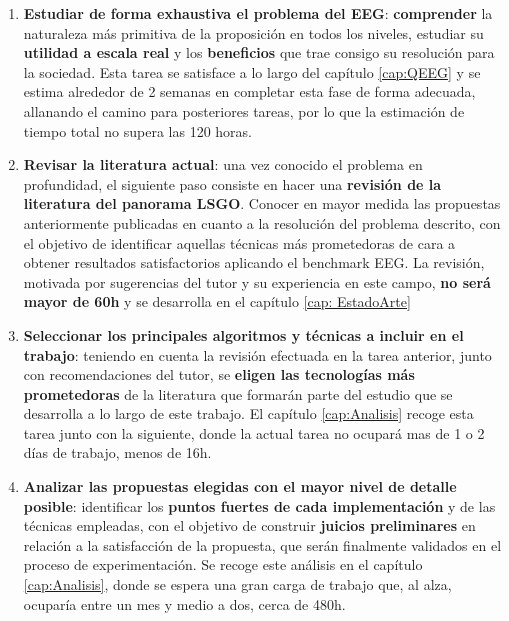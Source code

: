 \begin{enumerate}
	\item \label{tarea1} \textbf{Estudiar de forma exhaustiva el problema del EEG}: \textbf{comprender} la naturaleza más primitiva de la proposición en todos los niveles, estudiar su \textbf{utilidad a escala real} y los \textbf{beneficios} que trae consigo su resolución para la sociedad. Esta tarea se satisface a lo largo del capítulo \ref{cap:QEEG} y se estima alrededor de 2 semanas en completar esta fase de forma adecuada, allanando el camino para posteriores tareas, por lo que la estimación de tiempo total no supera las 120 horas. 
	
	\item \label{tarea2} \textbf{Revisar la literatura actual}: una vez conocido el problema en profundidad, el siguiente paso consiste en hacer una \textbf{revisión de la literatura del panorama LSGO}. Conocer en mayor medida las propuestas anteriormente publicadas en cuanto a la resolución del problema descrito, con el objetivo de identificar aquellas técnicas más prometedoras de cara a obtener resultados satisfactorios aplicando el benchmark EEG. La revisión, motivada por sugerencias del tutor y su experiencia en este campo, \textbf{no será mayor de 60h} y se desarrolla en el capítulo \ref{cap: EstadoArte}
	
	\item \label{tarea3} \textbf{Seleccionar los principales algoritmos y técnicas a incluir en el trabajo}: teniendo en cuenta la revisión efectuada en la tarea anterior, junto con recomendaciones del tutor, se \textbf{eligen las tecnologías más prometedoras} de la literatura que formarán parte del estudio que se desarrolla a lo largo de este trabajo. El capítulo \ref{cap:Analisis} recoge esta tarea junto con la siguiente, donde la actual tarea no ocupará mas de 1 o 2 días de trabajo, menos de 16h.
	
	\item  \label{tarea4}\textbf{Analizar las propuestas elegidas con el mayor nivel de detalle posible}: identificar los \textbf{puntos fuertes de cada implementación} y de las técnicas empleadas, con el objetivo de construir \textbf{juicios preliminares} en relación a la satisfacción de la propuesta, que serán finalmente validados en el proceso de experimentación. Se recoge este análisis en el capítulo \ref{cap:Analisis}, donde se espera una gran carga de trabajo que, al alza, ocuparía entre un mes y medio a dos, cerca de 480h.
	

\end{enumerate}
